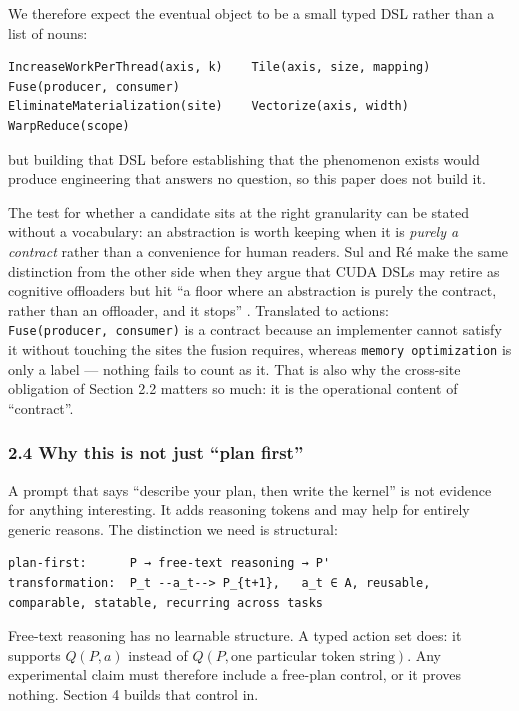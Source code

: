 \documentclass[
  11pt,
]{article}
\begin{document}
We therefore expect the eventual object to be a small typed DSL rather than a list of nouns:

\begin{verbatim}
IncreaseWorkPerThread(axis, k)    Tile(axis, size, mapping)      Fuse(producer, consumer)
EliminateMaterialization(site)    Vectorize(axis, width)         WarpReduce(scope)
\end{verbatim}

but building that DSL before establishing that the phenomenon exists would produce engineering that answers no question, so this paper does not build it.

The test for whether a candidate sits at the right granularity can be stated without a vocabulary: an abstraction is worth keeping when it is \emph{purely a contract} rather than a convenience for human readers. Sul and Ré make the same distinction from the other side when they argue that CUDA DSLs may retire as cognitive offloaders but hit ``a floor where an abstraction is purely the contract, rather than an offloader, and it stops'' \cite{retire36}. Translated to actions: \texttt{Fuse(producer,\ consumer)} is a contract because an implementer cannot satisfy it without touching the sites the fusion requires, whereas \texttt{memory\ optimization} is only a label --- nothing fails to count as it. That is also why the cross-site obligation of Section 2.2 matters so much: it is the operational content of ``contract''.

\hypertarget{why-this-is-not-just-plan-first}{%
\subsubsection{2.4 Why this is not just ``plan first''}\label{why-this-is-not-just-plan-first}}

A prompt that says ``describe your plan, then write the kernel'' is not evidence for anything interesting. It adds reasoning tokens and may help for entirely generic reasons. The distinction we need is structural:

\begin{verbatim}
plan-first:      P → free-text reasoning → P'
transformation:  P_t --a_t--> P_{t+1},   a_t ∈ A, reusable, comparable, statable, recurring across tasks
\end{verbatim}

Free-text reasoning has no learnable structure. A typed action set does: it supports \(Q(P, a)\) instead of \(Q(P, \text{one particular token string})\). Any experimental claim must therefore include a free-plan control, or it proves nothing. Section 4 builds that control in.
\end{document}
